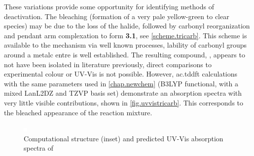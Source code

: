 These variations provide some opportunity for identifying methods of deactivation. The bleaching (formation of a very pale yellow-green to clear species) may be due to the loss of the halide, followed by carbonyl reorganization and pendant arm complexation to form \textbf{3.1}, see \autoref{scheme.tricarb}. This scheme is available to the mechanism via well known processes, lability of carbonyl groups around a metalc entre is well established. The resulting compound, , appears to not have been isolated in literature previously, direct comparisons to experimental colour or UV-Vis is not possible. However, \gls{ac.tddft} calculations with the same parameters used in \autoref{chap.newchem} (B3LYP functional, with a mixed LanL2DZ and TZVP basis set) demonstrate an absorption spectra with very little visible contributions, shown in \autoref{fig.uvvistricarb}. This corresponds to the bleached appearance of the reaction mixture. 

\begin{figure}[!htbp]
 \begin{center}
  \includegraphics[clip=true, keepaspectratio]{images/insertgraphic.eps}
 \end{center}
\caption[Structure and absorption spectra of proposed ]{Computational structure (inset) and predicted UV-Vis absorption spectra of }
\label{fig.uvvistricarb}
\end{figure} 







